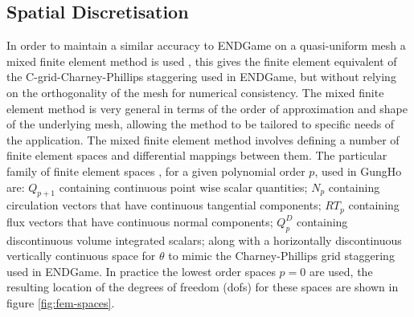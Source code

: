 \documentclass[review,times]{elsarticle}
\begin{document}
\subsection{Spatial Discretisation\label{sec:sub:spatial}}
In order to maintain a similar
accuracy to ENDGame on a quasi-uniform mesh a mixed finite element method is 
used \citep{cotter2012, natale2016}, this gives the finite element equivalent 
of the C-grid-Charney-Phillips staggering used in ENDGame, but without relying
on the orthogonality of the mesh for numerical consistency. The mixed finite element
method is very general in terms of the order of approximation and shape of the 
underlying mesh, allowing the method to be tailored to specific needs of the 
application. The mixed finite element method involves defining a number of finite 
element spaces and differential mappings between them. The particular family of 
finite element spaces \citep{boffi2013}, for a given polynomial order $p$, used 
in GungHo are: $Q_{p+1}$ containing continuous 
point wise scalar quantities; $N_p$ containing circulation vectors that have
continuous tangential components; $RT_p$ containing flux vectors that have 
continuous normal components; $Q_p^D$ containing discontinuous volume 
integrated scalars; along with a horizontally discontinuous vertically continuous 
space \citep{natale2016} for $\theta$ to mimic the Charney-Phillips grid staggering 
used in ENDGame.  In practice the lowest order spaces $p=0$ are used, the resulting
location of the degrees of freedom (dofs) for these spaces are shown in
figure \ref{fig:fem-spaces}. 
%
\end{document}
